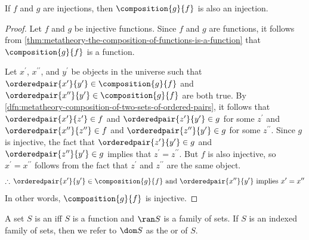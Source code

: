 \begin{thm}
     \label{thm:metatheory-the-composition-of-injective-functions-is-also-injective}
    If \( f \) and \( g \) are injections, then \( \composition{g}{f} \) is also an injection.
\end{thm}

\begin{proof}
    Let \( f \) and \( g \) be injective functions. Since \( f \) and \( g \) are functions,
    it follows from \cref{thm:metatheory-the-composition-of-functions-is-a-function} that \( \composition{g}{f} \)
    is a function.

    \vspace{0.3cm}
    \noindent
    Let \( x^{\prime} \), \( x^{\prime\prime} \), and \( y^{\prime} \) be objects in the universe such that
    \( \orderedpair{x^{\prime}}{y^{\prime}} \in \composition{g}{f} \) and \( \orderedpair{x^{\prime\prime}}{y^{\prime}} \in \composition{g}{f} \)
    are both true.
    By \cref{dfn:metatheory-composition-of-two-sets-of-ordered-pairs}, it follows that
    \( \orderedpair{x^{\prime}}{z^{\prime}} \in f \) and \( \orderedpair{z^{\prime}}{y^{\prime}} \in g \) for some \( z^{\prime} \)
    and \( \orderedpair{x^{\prime\prime}}{z^{\prime\prime}} \in f \) and \( \orderedpair{z^{\prime\prime}}{y^{\prime}} \in g \) for some \( z^{\prime\prime} \).
    Since \( g \) is injective, the fact that \( \orderedpair{z^{\prime}}{y^{\prime}} \in g \) and \( \orderedpair{z^{\prime\prime}}{y^{\prime}} \in g \)
    implies that \( z^{\prime} = z^{\prime\prime} \).
    But \( f \) is also injective, so \( x^{\prime} = x^{\prime\prime} \) follows from the fact that \( z^{\prime} \) and \( z^{\prime\prime} \) are the same object.
    \begin{equation*}
        \therefore \, \text{\( \orderedpair{x^{\prime}}{y^{\prime}} \in \composition{g}{f} \) and \( \orderedpair{x^{\prime\prime}}{y^{\prime}} \) implies
        \( x^{\prime} = x^{\prime\prime} \)}
    \end{equation*}
    In other words, \( \composition{g}{f} \) is injective.
\end{proof}

\begin{dfn}
     \label{dfn:metatheory-indexed-family-of-sets}
    A set \( S \) is an  iff \( S \) is a function and \( \ran S \) is a family of sets.
    If \( S \) is an indexed family of sets, then we refer to \( \dom S \) as the  or  of \( S \).
\end{dfn}

